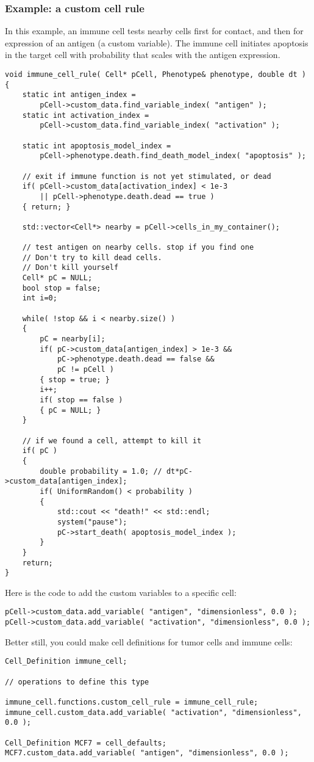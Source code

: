 \documentclass[12pt]{article}
\begin{document}
\subsubsection{Example: a custom cell rule}
\label{sec:Examples:custom_rule}
In this example, an immune cell tests nearby cells 
first for contact, and then for expression of an antigen (a custom variable). 
The immune cell initiates apoptosis in the target cell with 
probability that scales with the antigen expression. 
\begin{verbatim}
void immune_cell_rule( Cell* pCell, Phenotype& phenotype, double dt )
{
    static int antigen_index = 
        pCell->custom_data.find_variable_index( "antigen" ); 
    static int activation_index = 
        pCell->custom_data.find_variable_index( "activation" ); 
    
    static int apoptosis_model_index = 
        pCell->phenotype.death.find_death_model_index( "apoptosis" ); 
    
    // exit if immune function is not yet stimulated, or dead  
    if( pCell->custom_data[activation_index] < 1e-3 
        || pCell->phenotype.death.dead == true )
    { return; }

    std::vector<Cell*> nearby = pCell->cells_in_my_container(); 
    
    // test antigen on nearby cells. stop if you find one 
    // Don't try to kill dead cells. 
    // Don't kill yourself 
    Cell* pC = NULL; 
    bool stop = false; 
    int i=0; 
    
    while( !stop && i < nearby.size() )
    {
        pC = nearby[i]; 
        if( pC->custom_data[antigen_index] > 1e-3 && 
            pC->phenotype.death.dead == false && 
            pC != pCell )
        { stop = true; } 
        i++; 
        if( stop == false )
        { pC = NULL; }
    }
    
    // if we found a cell, attempt to kill it 
    if( pC )
    {
        double probability = 1.0; // dt*pC->custom_data[antigen_index]; 
        if( UniformRandom() < probability )
        {
            std::cout << "death!" << std::endl; 
            system("pause"); 
            pC->start_death( apoptosis_model_index ); 
        }
    }
    return; 
}
\end{verbatim}
Here is the code to add the custom variables to a specific cell: 
\begin{verbatim}
pCell->custom_data.add_variable( "antigen", "dimensionless", 0.0 ); 
pCell->custom_data.add_variable( "activation", "dimensionless", 0.0 ); 
\end{verbatim}
Better still, you could make cell definitions for tumor cells and 
immune cells: 
\begin{verbatim}
Cell_Definition immune_cell; 

// operations to define this type 

immune_cell.functions.custom_cell_rule = immune_cell_rule;
immune_cell.custom_data.add_variable( "activation", "dimensionless", 0.0 );

Cell_Definition MCF7 = cell_defaults; 
MCF7.custom_data.add_variable( "antigen", "dimensionless", 0.0 );
\end{verbatim}
\end{document}
